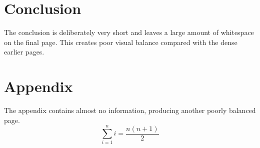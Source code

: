 \documentclass[10pt,a4paper]{article}
\begin{document}
\section{Conclusion}
The conclusion is deliberately very short and leaves a large amount of whitespace on the final page. This creates poor visual balance compared with the dense earlier pages.

\section*{Appendix}
The appendix contains almost no information, producing another poorly balanced page.
\[\sum_{i=1}^{n} i = \frac{n(n+1)}{2}\]
\end{document}
